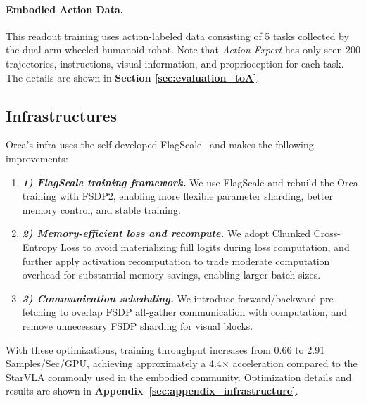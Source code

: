 \documentclass{llmxive}
\begin{document}
\paragraph{Embodied Action Data.} 
This readout training uses action-labeled data consisting of 5 tasks collected by the dual-arm wheeled humanoid robot. Note that \textit{Action Expert} has only seen 200 trajectories, instructions, visual information, and proprioception for each task. The details are shown in \textbf{Section \ref{sec:evaluation_toA}}.



\subsection{Infrastructures}
\label{sec:pretraining_infrastructures}

Orca's infra uses the self-developed FlagScale~\citep{flagscale} and makes the following improvements:


\vspace{-1ex}
\begin{enumerate}[
    leftmargin=1.35em,
    itemsep=0.35em,
    topsep=0.35em,
    parsep=0em
]
    \item[] \textbf{\textit{1) FlagScale training framework.}} 
    We use FlagScale and rebuild the Orca training with FSDP2, enabling more flexible parameter sharding, better memory control, and stable training.
    
    \item[] \textbf{\textit{2) Memory-efficient loss and recompute.}}
    We adopt Chunked Cross-Entropy Loss to avoid materializing full logits during loss computation, and further apply activation recomputation to trade moderate computation overhead for substantial memory savings, enabling larger batch sizes.
    
    \item[] \textbf{\textit{3) Communication scheduling.}}
    We introduce forward/backward pre-fetching to overlap FSDP all-gather communication with computation, and remove unnecessary FSDP sharding for visual blocks.
\end{enumerate}


With these optimizations, training throughput increases from 0.66 to 2.91 Samples/Sec/GPU, achieving approximately a 4.4$\times$ acceleration compared to the StarVLA \citep{StarVLA} commonly used in the embodied community. Optimization details and results are shown in \textbf{Appendix~\ref{sec:appendix_infrastructure}}.
\end{document}
